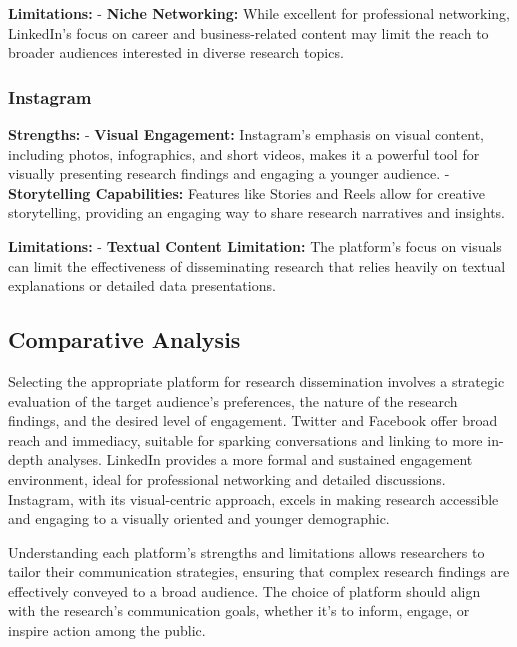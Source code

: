 \documentclass[
]{book}
\begin{document}
\textbf{Limitations:}
- \textbf{Niche Networking:} While excellent for professional networking, LinkedIn's focus on career and business-related content may limit the reach to broader audiences interested in diverse research topics.

\hypertarget{instagram}{%
\subsubsection{Instagram}\label{instagram}}

\textbf{Strengths:}
- \textbf{Visual Engagement:} Instagram's emphasis on visual content, including photos, infographics, and short videos, makes it a powerful tool for visually presenting research findings and engaging a younger audience.
- \textbf{Storytelling Capabilities:} Features like Stories and Reels allow for creative storytelling, providing an engaging way to share research narratives and insights.

\textbf{Limitations:}
- \textbf{Textual Content Limitation:} The platform's focus on visuals can limit the effectiveness of disseminating research that relies heavily on textual explanations or detailed data presentations.

\hypertarget{comparative-analysis}{%
\subsection{Comparative Analysis}\label{comparative-analysis}}

Selecting the appropriate platform for research dissemination involves a strategic evaluation of the target audience's preferences, the nature of the research findings, and the desired level of engagement. Twitter and Facebook offer broad reach and immediacy, suitable for sparking conversations and linking to more in-depth analyses. LinkedIn provides a more formal and sustained engagement environment, ideal for professional networking and detailed discussions. Instagram, with its visual-centric approach, excels in making research accessible and engaging to a visually oriented and younger demographic.

Understanding each platform's strengths and limitations allows researchers to tailor their communication strategies, ensuring that complex research findings are effectively conveyed to a broad audience. The choice of platform should align with the research's communication goals, whether it's to inform, engage, or inspire action among the public.
\end{document}
